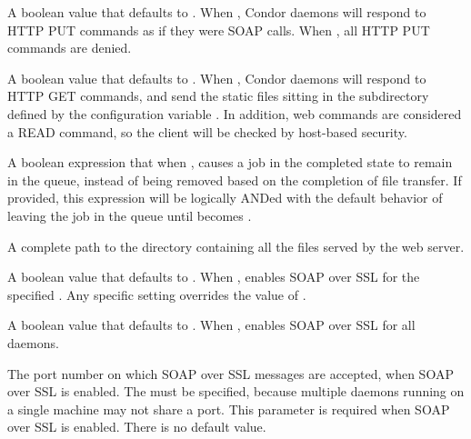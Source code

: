 \begin{description}

\label{param:EnableSoap}
\item[\Macro{ENABLE\_SOAP}]
  A boolean value that defaults to .
  When , Condor daemons will respond to HTTP PUT commands
  as if they were SOAP calls. When ,
  all HTTP PUT commands are denied.

\label{param:EnableWebServer}
\item[\Macro{ENABLE\_WEB\_SERVER}]
  A boolean value that defaults to .
  When , Condor daemons will respond to HTTP GET commands,
  and send the static files sitting in the subdirectory defined
  by the configuration variable .
  In addition, web commands are considered a READ command,
  so the client will be checked by host-based security.

\label{param:SoapLeaveInQueue}
\item[\Macro{SOAP\_LEAVE\_IN\_QUEUE}]
  A boolean expression that when ,
  causes a job in the completed state to remain in the queue,
  instead of being removed based on the completion of file transfer.
  If provided, this expression will be logically ANDed with the
  default behavior of leaving the job in the queue until 
  becomes .

\label{param:WebRootDir}
\item[\Macro{WEB\_ROOT\_DIR}]
  A complete path to the directory containing all the files served
  by the web server.

\label{param:SubsysEnableSoapSSL}
\item[\MacroB{<SUBSYS>\_ENABLE\_SOAP\_SSL}]
  A boolean value that defaults to .
  When , enables SOAP over SSL for the specified
  .
  Any specific  setting overrides
  the value of .

\label{param:EnableSoapSSL}
\item[\Macro{ENABLE\_SOAP\_SSL}]
  A boolean value that defaults to .
  When , enables SOAP over SSL for all daemons.

\label{param:SubsysSoapSSLPort}
\item[\MacroB{<SUBSYS>\_SOAP\_SSL\_PORT}]
  The port number on which SOAP over SSL messages are
  accepted, when SOAP over SSL is enabled.
  The  must be specified, because multiple daemons
  running on a single machine may not share a port.
  This parameter is required when SOAP over SSL is enabled.
  There is no default value.


\end{description}
